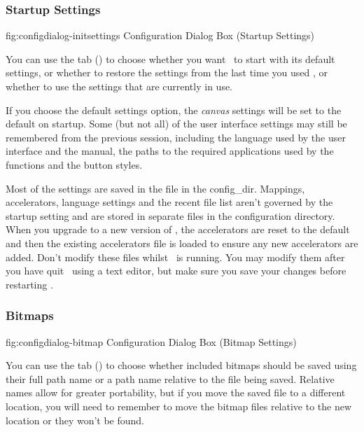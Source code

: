 \subsubsection{Startup Settings}\label{sec:initsettings}


\FloatFig
  {fig:configdialog-initsettings}
  {}
  {Configuration Dialog Box (Startup Settings)}

You can use the  tab
()
to choose whether you want \FlowframTk\ to start with its
default settings, or whether to restore the settings from the last
time you used \FlowframTk, or whether to use the settings that are
currently in use.

If you choose the default settings option, the \emph{\gls{canvas}}
settings will be set to the default on startup.  Some (but not all)
of the user interface settings may still be remembered from the
previous session, including the language used by the user interface
and the manual, the paths to the required applications used by the
 functions and the button styles.

Most of the settings are saved in the file  in the
\gls{config_dir}.  Mappings,
accelerators, language settings and the recent file list aren't
governed by the startup setting and are stored in separate files in
the configuration directory. When you upgrade to a new version of
\FlowframTk, the accelerators are reset to the default and then the
existing accelerators file is loaded to ensure any new accelerators
are added. Don't modify these files whilst \FlowframTk\ is running.
You may modify them after you have quit \FlowframTk\ using a text
editor, but make sure you save your changes before restarting
\FlowframTk.


\subsubsection{Bitmaps}\label{sec:bitmapconfig}


\FloatFig
  {fig:configdialog-bitmap}
  {}
  {Configuration Dialog Box (Bitmap Settings)}

You can use the  tab
()
to choose whether included \glspl{bitmap} should be
saved using their full path name or a path name relative to the
file being saved. Relative names allow for greater portability, but
if you move the saved file to a different location, you will need to
remember to move the bitmap files relative to the new location or
they won't be found.

